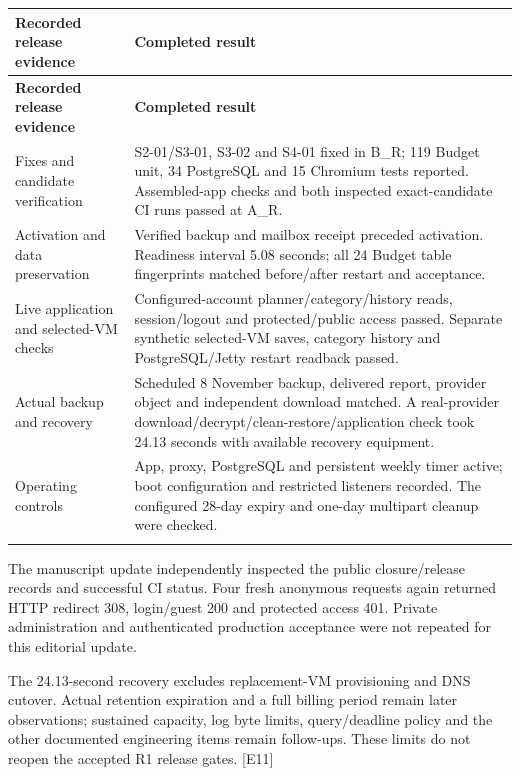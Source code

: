 \documentclass[11pt,a4paper]{article}
\begin{document}
{\fontsize{9.5}{11.5}\selectfont
\begin{longtable}{@{}>{\raggedright\arraybackslash}p{}>{\raggedright\arraybackslash}p{}@{}}\toprule
\textbf{Recorded release evidence} & \textbf{Completed result} \\ \midrule\endfirsthead
\toprule\textbf{Recorded release evidence} & \textbf{Completed result} \\ \midrule\endhead
\bottomrule\endfoot
Fixes and candidate verification & S2-01/\allowbreak{}S3-01, S3-02 and S4-01 fixed in B\_R; 119 Budget unit, 34 PostgreSQL and 15 Chromium tests reported. Assembled-app checks and both inspected exact-candidate CI runs passed at A\_R. \\ \addlinespace[3pt]
Activation and data preservation & Verified backup and mailbox receipt preceded activation. Readiness interval 5.08 seconds; all 24 Budget table fingerprints matched before/\allowbreak{}after restart and acceptance. \\ \addlinespace[3pt]
Live application and selected-VM checks & Configured-account planner/\allowbreak{}category/\allowbreak{}history reads, session/\allowbreak{}logout and protected/\allowbreak{}public access passed. Separate synthetic selected-VM saves, category history and PostgreSQL/\allowbreak{}Jetty restart readback passed. \\ \addlinespace[3pt]
Actual backup and recovery & Scheduled 8 November backup, delivered report, provider object and independent download matched. A real-provider download/\allowbreak{}decrypt/\allowbreak{}clean-restore/\allowbreak{}application check took 24.13 seconds with available recovery equipment. \\ \addlinespace[3pt]
Operating controls & App, proxy, PostgreSQL and persistent weekly timer active; boot configuration and restricted listeners recorded. The configured 28-day expiry and one-day multipart cleanup were checked. \\ \addlinespace[3pt]
\end{longtable}}

The manuscript update independently inspected the public closure/\allowbreak{}release records and successful CI status. Four fresh anonymous requests again returned HTTP redirect 308, login/\allowbreak{}guest 200 and protected access 401. Private administration and authenticated production acceptance were not repeated for this editorial update.

The 24.13-second recovery excludes replacement-VM provisioning and DNS cutover. Actual retention expiration and a full billing period remain later observations; sustained capacity, log byte limits, query/\allowbreak{}deadline policy and the other documented engineering items remain follow-ups. These limits do not reopen the accepted R1 release gates. [E11]
\end{document}
